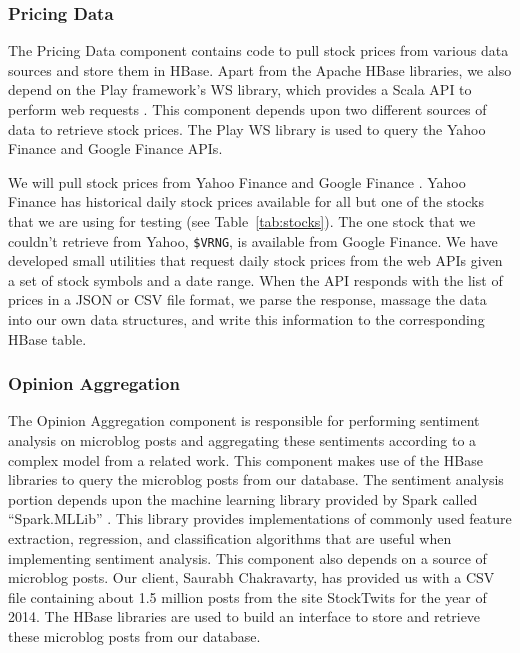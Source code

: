\subsubsection{Pricing Data}

The Pricing Data component contains code to pull stock prices from various data sources and store them in HBase.
Apart from the Apache HBase libraries, we also depend on the Play framework's \cite{playframework} WS library, which provides a Scala API to perform web requests \cite{playws}.
This component depends upon two different sources of data to retrieve stock prices.
The Play WS library is used to query the Yahoo Finance and Google Finance APIs.

We will pull stock prices from Yahoo Finance \cite{yahoofinance} and Google Finance \cite{googlefinance}.
Yahoo Finance has historical daily stock prices available for all but one of the stocks that we are using for testing (see Table~\ref{tab:stocks}).
The one stock that we couldn't retrieve from Yahoo, \texttt{\$VRNG}, is available from Google Finance.
We have developed small utilities that request daily stock prices from the web APIs given a set of stock symbols and a date range.
When the API responds with the list of prices in a JSON \cite{json} or CSV \cite{csv} file format, we parse the response, massage the data into our own data structures, and write this information to the corresponding HBase table.

\subsubsection{Opinion Aggregation}

The Opinion Aggregation component is responsible for performing sentiment analysis on microblog posts and aggregating these sentiments according to a complex model from a related work.
This component makes use of the HBase libraries to query the microblog posts from our database.
The sentiment analysis portion depends upon the machine learning library provided by Spark called ``Spark.MLLib'' \cite{sparkml}.
This library provides implementations of commonly used feature extraction, regression, and classification algorithms that are useful when implementing sentiment analysis.
This component also depends on a source of microblog posts.
Our client, Saurabh Chakravarty, has provided us with a CSV file containing about 1.5 million posts from the site StockTwits \cite{stocktwits} for the year of 2014.
The HBase libraries are used to build an interface to store and retrieve these microblog posts from our database.

